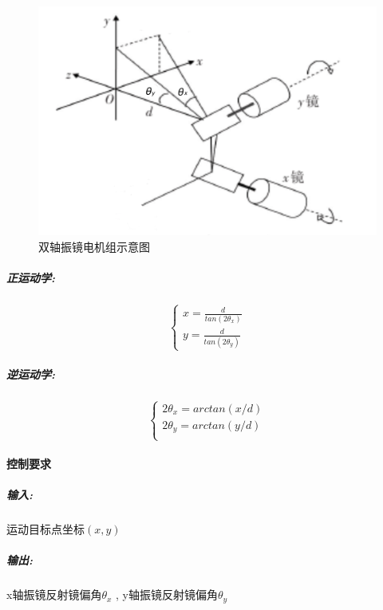 \documentclass[a4paper,12pt,onecolumn,twoside]{article}
\begin{document}
\begin{figure}[htbp]
\includegraphics[width=\linewidth]{MG4.png}
\caption{双轴振镜电机组示意图}
\end{figure}

\subparagraph{正运动学:}
\begin{equation}
\left\{
\begin{array}{c}
x=\frac{d}{tan(2\theta_x)} \\
y=\frac{d}{tan(2\theta_y)} 
\end{array}
\right.
\end{equation}
\subparagraph{逆运动学:}
\begin{equation}
\left\{
\begin{array}{c}
2\theta_x = arctan(x/d)  \\
2\theta_y =  arctan(y/d) \\
\end{array}
\right.
\end{equation}
 \paragraph{控制要求}
\subparagraph{输入:}
运动目标点坐标$(x,y)$
\subparagraph{输出:}
x轴振镜反射镜偏角$\theta_x$ , y轴振镜反射镜偏角$\theta_y$
\end{document}

